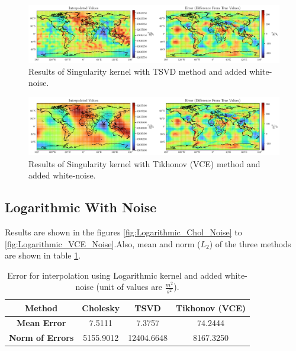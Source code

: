 \documentclass[12pt]{article}
\begin{document}
	\clearpage
	
	\begin{figure}[h!]
		\centering
		\includegraphics[width=16cm]{../Outputs/Singularity_TSVD_Noise.pdf}
		\caption{Results of Singularity kernel with TSVD method and added white-noise.}
		\label{fig:Singularity_TSVD_Noise}
	\end{figure}
	
	\begin{figure}[h!]
		\centering
		\includegraphics[width=16cm]{../Outputs/Singularity_VCE_Noise.pdf}
		\caption{Results of Singularity kernel with Tikhonov (VCE) method and added white-noise.}
		\label{fig:Singularity_VCE_Noise}
	\end{figure}


	\subsection{Logarithmic With Noise}
	
	Results are shown in the figures \ref{fig:Logarithmic_Chol_Noise} to \ref{fig:Logarithmic_VCE_Noise}.Also, mean and norm ($L_2$) of the three methods are shown in table \ref{tab:Logarithmic_Error_Noise}.
	
	\begin{table}[h!]
		\centering
		\caption{Error for interpolation using Logarithmic kernel and added white-noise (unit of values are $\frac{m^2}{s^2}$).}
		\vspace{0.3cm}
		\renewcommand{\arraystretch}{1.4}
		\begin{tabular}{c|c|c|c}
			\textbf{Method} & Cholesky & TSVD & Tikhonov (VCE) \\
			\hline 
			\textbf{Mean Error} & 7.5111 & 7.3757 & 74.2444 \\
			\hline 
			\textbf{Norm of Errors} & 5155.9012 & 12404.6648 & 8167.3250 \\
		\end{tabular}
		\label{tab:Logarithmic_Error_Noise}
	\end{table}
	
\end{document}
